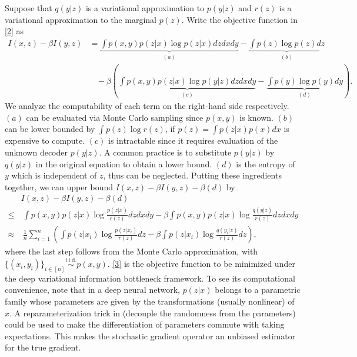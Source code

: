 \documentclass[10pt,a4paper]{amsart}
\numberwithin{equation}{section}
\theoremstyle{plain}
\theoremstyle{definition}
\begin{document}
Suppose that $q(y|z)$ is a variational approximation to $p(y|z)$ and $r(z)$ is a variational approximation to the marginal $p(z)$. Write the objective function in \eqref{2} as
\begin{align}
I(x,z)-\beta I(y,z) & = \underbrace{\int p(x,y)p(z|x)\log p(z|x)dzdxdy}_{(a)} - \underbrace{\int p(z)\log p(z)dz}_{(b)}\nonumber\\
                                                &\ \ \ \ -\beta\left(\underbrace{\int p(x,y)p(z|x)\log p(y|z)dzdxdy}_{(c)} - \underbrace{\int p(y)\log p(y)dy}_{(d)}\right)\nonumber.
\end{align}
We analyze the computability of each term on the right-hand side respectively. $(a)$ can be evaluated via Monte Carlo sampling since $p(x,y)$ is known. 
$(b)$ can be lower bounded by $\int p(z)\log r(z)$, if $p(z) = \int p(z|x)p(x) dx$ is expensive to compute.
$(c)$ is intractable since it requires evaluation of the unknown decoder $p(y|z)$. A common practice is to substitute $p(y|z)$ by $q(y|z)$ in the original equation to obtain a lower bound.  
$(d)$ is the entropy of $y$ which is independent of $z$, thus can be neglected. Putting these ingredients together, we can upper bound $I(x,z)-\beta I(y,z) - \beta(d)$ by
\begin{align}
&I(x,z)-\beta I(y,z) - \beta (d)\nonumber\\
\leq&\  \int p(x,y)p(z|x) \log \frac{p(z|x)}{r(z)}dzdxdy - \beta\int p(x,y)p(z|x) \log \frac{q(y|z)}{r(z)}dzdxdy\nonumber\\
\approx&\ \frac{1}{n}\sum_{i=1}^n \left(\int p(z|x_i) \log \frac{p(z|x_i)}{r(z)}dz - \beta\int p(z|x_i) \log \frac{q(y_i|z)}{r(z)}dz\right),\label{3}
\end{align}
where the last step follows from the Monte Carlo approximation, with $\{(x_i, y_i)\}_{i\in [n]}\stackrel{\text{i.i.d.}}{\sim} p(x,y)$. \eqref{3} is the objective function to be minimized under the deep variational information bottleneck framework. To see its computational convenience, note that in a deep neural network, $p(z|x)$ belongs to a parametric family whose parameters are given by the transformations (usually nonlinear) of $x$. A reparameterization trick in \cite{kingma2013auto} (decouple the randomness from the parameters) could be used to make the differentiation of parameters commute with taking expectations. This makes the stochastic gradient operator an unbiased estimator for the true gradient.   



\printbibliography
\end{document}
